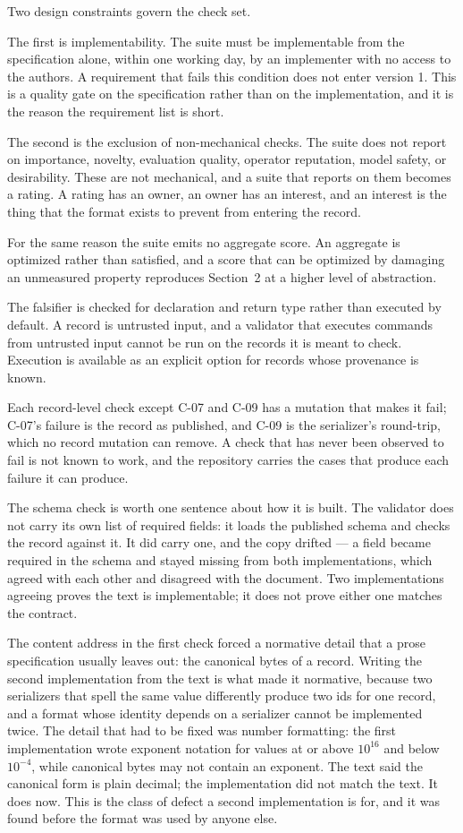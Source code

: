 \documentclass[11pt]{article}
\begin{document}
Two design constraints govern the check set.

The first is implementability. The suite must be implementable from the
specification alone, within one working day, by an implementer with no access
to the authors. A requirement that fails this condition does not enter version
1. This is a quality gate on the specification rather than on the
implementation, and it is the reason the requirement list is short.

The second is the exclusion of non-mechanical checks. The suite does not report
on importance, novelty, evaluation quality, operator reputation, model safety,
or desirability. These are not mechanical, and a suite that reports on them
becomes a rating. A rating has an owner, an owner has an interest, and an
interest is the thing that the format exists to prevent from entering the
record.

For the same reason the suite emits no aggregate score. An aggregate is
optimized rather than satisfied, and a score that can be optimized by damaging
an unmeasured property reproduces Section~2 at a higher level of abstraction.

The falsifier is checked for declaration and return type rather than executed
by default. A record is untrusted input, and a validator that executes commands
from untrusted input cannot be run on the records it is meant to check.
Execution is available as an explicit option for records whose provenance is
known.

Each record-level check except C-07 and C-09 has a mutation that makes it fail;
C-07's failure is the record as published, and C-09 is the serializer's
round-trip, which no record mutation can remove. A check that has never been
observed to fail is not known to work, and the repository carries the cases that
produce each failure it can produce.

The schema check is worth one sentence about how it is built. The validator
does not carry its own list of required fields: it loads the published schema
and checks the record against it. It did carry one, and the copy drifted --- a
field became required in the schema and stayed missing from both
implementations, which agreed with each other and disagreed with the document.
Two implementations agreeing proves the text is implementable; it does not
prove either one matches the contract.

The content address in the first check forced a normative detail that a prose
specification usually leaves out: the canonical bytes of a record. Writing the
second implementation from the text is what made it normative, because two
serializers that spell the same value differently produce two ids for one
record, and a format whose identity depends on a serializer cannot be
implemented twice. The detail that had to be fixed was number formatting: the
first implementation wrote exponent notation for values at or above $10^{16}$
and below $10^{-4}$, while canonical bytes may not contain an exponent. The
text said the canonical form is plain decimal; the implementation did not match
the text. It does now. This is the class of defect a second implementation is
for, and it was found before the format was used by anyone else.
\end{document}

